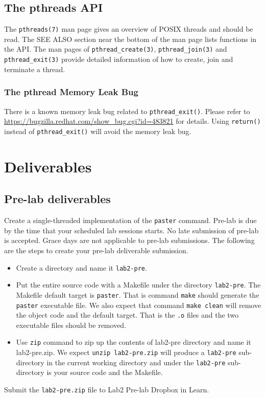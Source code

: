 \subsection{The pthreads API}
\label{sec:pthreads}
The \verb+pthreads(7)+ man page gives an overview of POSIX threads and should be read. The SEE ALSO section near the bottom of the man page lists functions in the API. The man pages of \verb+pthread_create(3)+, \verb+pthread_join(3)+ and \verb+pthread_exit(3)+ provide detailed information of how to create, join and terminate a thread.

\subsubsection{The pthread Memory Leak Bug}
\label{sec:pthread-memory-leak}

There is a known memory leak bug related to \verb+pthread_exit()+. Please refer to  \url{https://bugzilla.redhat.com/show_bug.cgi?id=483821} for details. Using \verb+return()+ instead of \verb+pthread_exit()+ will avoid the memory leak bug.

\section{Deliverables}

\subsection{Pre-lab deliverables}
\label{sec:lab2-pre-lab-deliverable}
Create a single-threaded implementation of the \verb+paster+ command. Pre-lab is due by the time that your scheduled lab sessions starts. No late submission of pre-lab is accepted. Grace days are not applicable to pre-lab submissions. The following are the steps to create your pre-lab deliverable submission.
\begin{itemize}
\item Create a directory and name it \verb+lab2-pre+.
\item Put the entire source code with a Makefile under the directory \verb+lab2-pre+. The Makefile default target is \verb+paster+. That is command \verb+make+ should generate the \verb+paster+ executable file. We also expect that command \verb+make clean+ will remove the object code and the default target. That is the \verb+.o+ files and the two executable files should be removed.
\item Use \verb+zip+ command to zip up the contents of lab2-pre directory and name it lab2-pre.zip. We expect \verb+unzip lab2-pre.zip+ will produce a \verb+lab2-pre+ sub-directory in the current working directory and under the \verb+lab2-pre+ sub-directory is your source code and the Makefile.
\end{itemize}
Submit the \verb+lab2-pre.zip+ file to Lab2 Pre-lab Dropbox in Learn.

